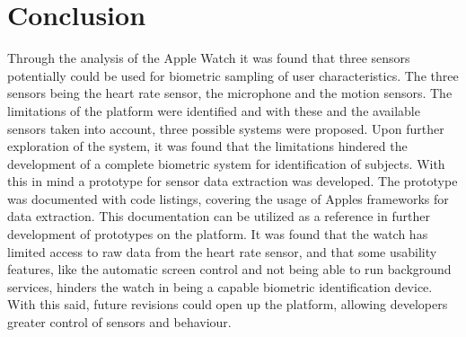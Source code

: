 \section{Conclusion}
Through the analysis of the Apple Watch it was found that three sensors
potentially could be used for biometric sampling of user characteristics. 
The three sensors being the heart rate sensor, the microphone and the motion
sensors. The limitations of the platform were identified and with these and the
available sensors taken into account, three possible systems were proposed.
Upon further exploration of the system, it was found that the limitations
hindered the development of a complete biometric system for identification of
subjects. With this in mind a prototype for sensor data extraction was
developed. The prototype was documented with code listings, covering the usage
of Apples frameworks for data extraction. This documentation can be utilized as
a reference in further development of prototypes on the platform. It was found
that the watch has limited access to raw data from the heart rate sensor, and
that some usability features, like the automatic screen control and not being
able to run background services, hinders the watch in being a capable biometric 
identification device. With this said, future revisions could open up the
platform, allowing developers greater control of sensors and behaviour.
 
